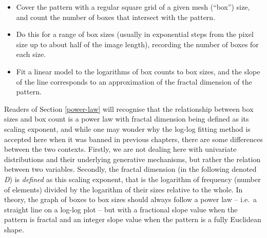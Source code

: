\documentclass[
  12pt,
  a4paper, twoside]{book}
\begin{document}
\begin{itemize}
\item
  Cover the pattern with a regular square grid of a given mesh (``box'') size, and count the number of boxes that intersect with the pattern.
\item
  Do this for a range of box sizes (usually in exponential steps from the pixel size up to about half of the image length), recording the number of boxes for each size.
\item
  Fit a linear model to the logarithms of box counts to box sizes, and the slope of the line corresponds to an approximation of the fractal dimension of the pattern.
\end{itemize}

Readers of Section \ref{power-law} will recognise that the relationship between box sizes and box count is a power law with fractal dimension being defined as its scaling exponent, and while one may wonder why the log-log fitting method is accepted here when it was banned in previous chapters, there are some differences between the two contexts. Firstly, we are not dealing here with univariate distributions and their underlying generative mechanisms, but rather the relation between two variables. Secondly, the fractal dimension (in the following denoted \emph{D}) is \emph{defined} as this scaling exponent, that is the logarithm of frequency (number of elements) divided by the logarithm of their sizes relative to the whole. In theory, the graph of boxes to box sizes should always follow a power law -- i.e.~a straight line on a log-log plot -- but with a fractional slope value when the pattern is fractal and an integer slope value when the pattern is a fully Euclidean shape.
\end{document}
